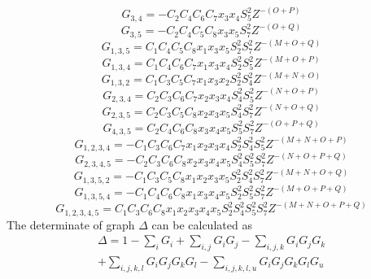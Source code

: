 \documentclass{osa-article}
\begin{document}
 \begin{equation}
G_{3,4}=-C_2C_4C_6C_7x_3x_4{S^2_5}Z^{-(O+P)}
\label{eqa28}
\end{equation}
 \begin{equation}
G_{3,5}=-C_2C_4C_5C_8x_3x_5{S^2_7}Z^{-(O+Q)}
\label{eqa29}
\end{equation}
 \begin{equation}
G_{1,3,5}=C_1C_4C_5C_8x_1x_3x_5{S^2_2}{S^2_7}Z^{-(M+O+Q)}
\label{eqa30}
\end{equation}
 \begin{equation}
G_{1,3,4}=C_1C_4C_6C_7x_1x_3x_4{S^2_2}{S^2_5}Z^{-(M+O+P)}
\label{eqa31}
\end{equation}
 \begin{equation}
G_{1,3,2}=C_1C_3C_5C_7x_1x_3x_2{S^2_2}{S^2_4}Z^{-(M+N+O)}
\label{eqa32}
\end{equation}
 \begin{equation}
G_{2,3,4}=C_2C_3C_6C_7x_2x_3x_4{S^2_4}{S^2_5}Z^{-(N+O+P)}
\label{eqa33}
\end{equation}
 \begin{equation}
G_{2,3,5}=C_2C_3C_5C_8x_2x_3x_5{S^2_4}{S^2_7}Z^{-(N+O+Q)}
\label{eqa34}
\end{equation}
 \begin{equation}
G_{4,3,5}=C_2C_4C_6C_8x_3x_4x_5{S^2_5}{S^2_7}Z^{-(O+P+Q)}
\label{eqa35}
\end{equation}
 \begin{equation}
G_{1,2,3,4}=-C_1C_3C_6C_7x_1x_2x_3x_4{S^2_2}{S^2_4}{S^2_5}Z^{-(M+N+O+P)}
\label{eqa36}
\end{equation}
 \begin{equation}
G_{2,3,4,5}=-C_2C_3C_6C_8x_2x_3x_4x_5{S^2_4}{S^2_5}{S^2_7}Z^{-(N+O+P+Q)}
\label{eqa37}
\end{equation}
 \begin{equation}
G_{1,3,5,2}=-C_1C_3C_5C_8x_1x_2x_3x_5{S^2_2}{S^2_4}{S^2_7}Z^{-(M+N+O+Q)}
\label{eqa38}
\end{equation}
 \begin{equation}
G_{1,3,5,4}=-C_1C_4C_6C_8x_1x_3x_4x_5{S^2_2}{S^2_5}{S^2_7}Z^{-(M+O+P+Q)}
\label{eqa39}
\end{equation}
 \begin{equation}
G_{1,2,3,4,5}=C_1C_3C_6C_8x_1x_2x_3x_4x_5{S^2_2}{S^2_4}{S^2_5}{S^2_7}Z^{-(M+N+O+P+Q)}
\label{eqa40}
\end{equation}
The determinate of graph \textit {$\Delta$} can be calculated as\\
\begin{equation}
\begin{split}
\Delta=
1-\sum_{i} {G_i}+\sum_{i,j} {G_i G_j}-\sum_{i,j,k} {G_i G_j G_k}\\+\sum_{i,j,k,l} {G_i G_j G_kG_l}-\sum_{i,j,k,l,u} {G_i G_j G_kG_lG_u} 
\label{eqa41}
\end{split}
\end{equation}
\end{document}
